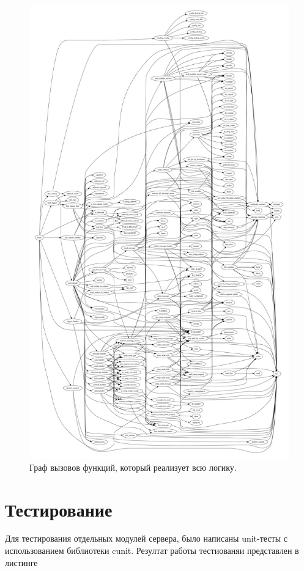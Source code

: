 \documentclass[a4paper,12pt]{report}
\begin{document}
	
	\begin{figure}[H]
	\centering
	\includegraphics[width=\textwidth]{./include/cflow.pdf}
	\caption{Граф вызовов функций, который реализует всю логику.}
	\label{fig:event}
	\end{figure}



	\section{Тестирование}
		Для тестирования отдельных модулей сервера, было написаны unit-тесты
		с использованием библиотеки cunit. Резултат работы тестиованяи представлен
		в листинге 
		
\end{document}
